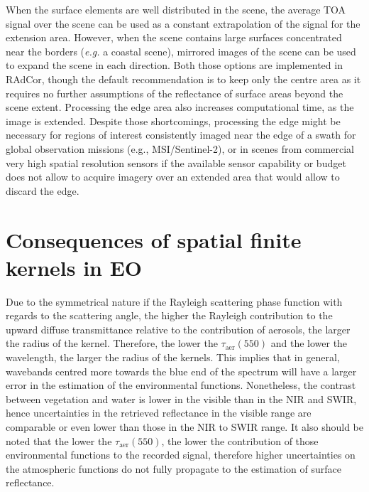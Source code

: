 When the surface elements are well distributed in the scene, the average TOA signal over the scene can be used as a constant extrapolation of the signal for the extension area. However, when the scene contains large surfaces concentrated near the borders (\textit{e.g.} a coastal scene), mirrored images of the scene can be used to expand the scene in each direction. Both those options are implemented in RAdCor, though the default recommendation is to keep only the centre area as it requires no further assumptions of the reflectance of surface areas beyond the scene extent. Processing the edge area also increases computational time, as the image is extended. Despite those shortcomings, processing the edge might be necessary for regions of interest consistently imaged near the edge of a swath for global observation missions (e.g., MSI/Sentinel-2), or in scenes from commercial very high spatial resolution sensors if the available sensor capability or budget does not allow to acquire imagery over an extended area that would allow to discard the edge.

\section{Consequences of spatial finite kernels in EO}

Due to the symmetrical nature if the Rayleigh scattering phase function with regards to the scattering angle, the higher the Rayleigh contribution to the upward diffuse transmittance relative to the contribution of aerosols, the larger the radius of the kernel. Therefore, the lower the $\tau_\text{aer}(550)$ and the lower the wavelength, the larger the radius of the kernels. This implies that in general, wavebands centred more towards the blue end of the spectrum will have a larger error in the estimation of the environmental functions. Nonetheless, the contrast between vegetation and water is lower in the visible than in the NIR and SWIR, hence uncertainties in the retrieved reflectance in the visible range are comparable or even lower than those in the NIR to SWIR range. It also should be noted that the lower the $\tau_\text{aer}(550)$, the lower the contribution of those environmental functions to the recorded signal, therefore higher uncertainties on the atmospheric functions do not fully propagate to the estimation of surface reflectance.




